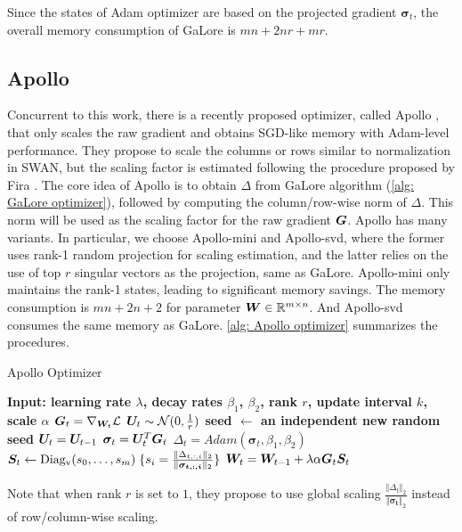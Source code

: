 Since the states of Adam optimizer are based on the projected gradient $\bm{\sigma}_t$, the overall memory consumption of GaLore is $mn+2nr+mr$. 

\subsection{Apollo}
\label{subapp: Apollo}
Concurrent to this work, there is a recently proposed optimizer, called Apollo \citep{zhu2024apollo}, that only scales the raw gradient and obtains SGD-like memory with Adam-level performance. They propose to scale the columns or rows similar to normalization in SWAN, but the scaling factor is estimated following the procedure proposed by Fira \citep{chen2024fira}. The core idea of Apollo is to obtain $\Delta$ from GaLore algorithm (\cref{alg: GaLore optimizer}), followed by computing the column/row-wise norm of $\Delta$. This norm will be used as the scaling factor for the raw gradient ${\bm{G}}$. Apollo has many variants. In particular, we choose Apollo-mini and Apollo-svd, where the former uses rank-1 random projection for scaling estimation, and the latter relies on the use of top $r$ singular vectors as the projection, same as GaLore.
Apollo-mini only maintains the rank-1 states, leading to significant memory savings. The memory consumption is $mn+2n+2$ for parameter ${\bm{W}}\in\mathbb{R}^{m\times n}$. And Apollo-svd consumes the same memory as GaLore. \cref{alg: Apollo optimizer} summarizes the procedures.

\begin{algorithm}
    \caption{Apollo Optimizer}
    \label{alg: Apollo optimizer}
    \begin{algorithmic}
        \STATE \bfseries{Input:} learning rate $\lambda$, decay rates $\beta_1$, $\beta_2$, rank $r$, update interval $k$, scale $\alpha$
        \STATE ${\bm{G}}_t=\nabla_{{\bm{W}}_t}\mathcal{L}$
            \STATE ${\bm{U}}_t\sim \mathcal{N}(0,\frac{1}{r})$
            \STATE seed $\leftarrow$ an independent new random seed
        \ELSE
            \STATE ${\bm{U}}_t={\bm{U}}_{t-1}$
        \ENDIF
        \STATE $\bm{\sigma}_t={\bm{U}}_t^T{\bm{G}}_t$
        \STATE $\Delta_t = Adam(\bm{\sigma}_t, \beta_1,\beta_2)$
        \STATE ${\bm{S}}_t \leftarrow \operatorname{Diag_v}(s_0, \ldots, s_m)\;\{s_i=\frac{\Vert\Delta_{t,:,i}\Vert_2}{\Vert\bm{\sigma_{t,:,i}}\Vert_2}\}$ 
        \STATE ${\bm{W}}_t = {\bm{W}}_{t-1} + \lambda\alpha{\bm{G}}_t{\bm{S}}_t$
        \ENDFOR
    \end{algorithmic}
\end{algorithm}
Note that when rank $r$ is set to $1$, they propose to use global scaling $\frac{\Vert\Delta_t\Vert_2}{\Vert\bm{\sigma_t}\Vert_2}$ instead of row/column-wise scaling. 


